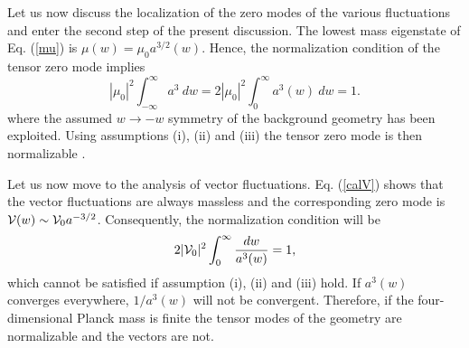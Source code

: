 \documentclass[a4paper,12pt]{article}
\begin{document}
Let us now discuss the localization of the zero modes of the various 
fluctuations and enter the second step of the present discussion.
The lowest mass eigenstate of Eq. (\ref{mu}) 
is  $\mu(w) = {\mu_0} a^{3/2}(w)$. Hence, the normalization 
condition of the tensor zero mode implies 
\begin{equation}
|\mu_0|^2 \int_{-\infty}^{\infty} a^3 ~dw = 2 |\mu_0|^2\int_{0}^{\infty}a^3(w)
~ dw=1 .
\end{equation} 
where the assumed $w\rightarrow -w $ symmetry of the background geometry 
has been exploited. Using assumptions (i), (ii) and (iii) the tensor 
zero mode is then normalizable \cite{rs,rs2}. 

Let us now move to the analysis of vector fluctuations.
 Eq. (\ref{calV}) shows that the vector fluctuations are 
always massless and the corresponding zero mode is ${\cal V}(w) \sim 
{\cal V}_0 a^{-3/2} $. Consequently, the normalization 
condition will be 
\begin{equation}
2 |{\cal V}_0|^2 \int_{0}^{\infty} \frac{d w}{a^3(w)} =1,
\end{equation}
which cannot be satisfied if assumption (i), (ii) and (iii) hold. If $a^3(w)$ 
converges everywhere, $1/a^3(w)$ will not be convergent.
Therefore, if the four-dimensional Planck mass 
is finite the tensor modes of the geometry are normalizable and the vectors 
are not.
\end{document}
